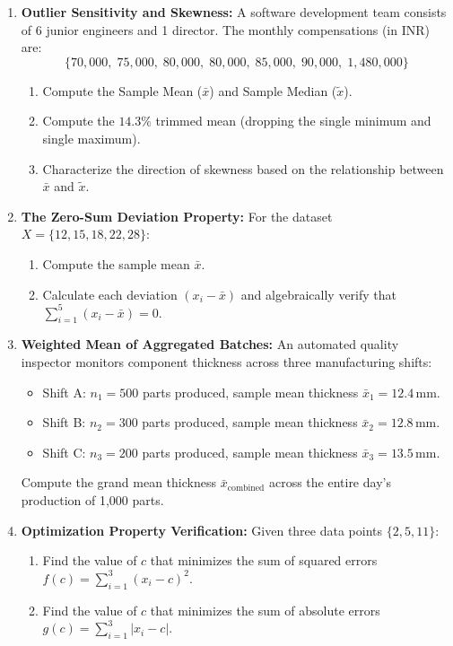 \begin{enumerate}
    \item \textbf{Outlier Sensitivity and Skewness:} A software development team consists of 6 junior engineers and 1 director. The monthly compensations (in INR) are:
    $$\{70{,}000,\; 75{,}000,\; 80{,}000,\; 80{,}000,\; 85{,}000,\; 90{,}000,\; 1{,}480{,}000\}$$
    \begin{enumerate}
        \item Compute the Sample Mean ($\bar{x}$) and Sample Median ($\tilde{x}$).
        \item Compute the $14.3\%$ trimmed mean (dropping the single minimum and single maximum).
        \item Characterize the direction of skewness based on the relationship between $\bar{x}$ and $\tilde{x}$.
    \end{enumerate}

    \item \textbf{The Zero-Sum Deviation Property:} For the dataset $X = \{12, 15, 18, 22, 28\}$:
    \begin{enumerate}
        \item Compute the sample mean $\bar{x}$.
        \item Calculate each deviation $(x_i - \bar{x})$ and algebraically verify that $\sum_{i=1}^5 (x_i - \bar{x}) = 0$.
    \end{enumerate}

    \item \textbf{Weighted Mean of Aggregated Batches:} An automated quality inspector monitors component thickness across three manufacturing shifts:
    \begin{itemize}
        \item Shift A: $n_1 = 500$ parts produced, sample mean thickness $\bar{x}_1 = 12.4\,\text{mm}$.
        \item Shift B: $n_2 = 300$ parts produced, sample mean thickness $\bar{x}_2 = 12.8\,\text{mm}$.
        \item Shift C: $n_3 = 200$ parts produced, sample mean thickness $\bar{x}_3 = 13.5\,\text{mm}$.
    \end{itemize}
    Compute the grand mean thickness $\bar{x}_{\text{combined}}$ across the entire day's production of 1,000 parts.

    \item \textbf{Optimization Property Verification:} Given three data points $\{2, 5, 11\}$:
    \begin{enumerate}
        \item Find the value of $c$ that minimizes the sum of squared errors $f(c) = \sum_{i=1}^3 (x_i - c)^2$.
        \item Find the value of $c$ that minimizes the sum of absolute errors $g(c) = \sum_{i=1}^3 |x_i - c|$.
    \end{enumerate}


\end{enumerate}
